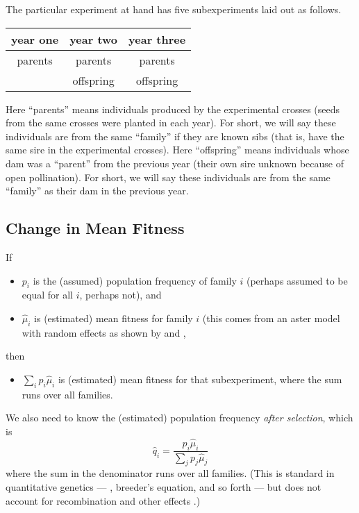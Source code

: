 \documentclass[11pt]{article}
\begin{document}
The particular experiment at hand has five subexperiments laid out as follows.
\begin{center}
\begin{tabular}{ccc}
\toprule
year one & year two & year three \\
\midrule
parents & parents & parents \\
        & offspring & offspring \\
\bottomrule
\end{tabular}
\end{center}
Here ``parents'' means individuals produced by the experimental crosses
(seeds from
the same crosses were planted in each year).  For short, we will say these
individuals are from the same ``family'' if they are known sibs
(that is, have the same sire in the experimental crosses).
Here ``offspring'' means individuals whose dam was a ``parent'' from the
previous year (their own sire unknown because of open pollination).
For short, we will say these
individuals are from the same ``family'' as their dam in the previous year.

\subsection{Change in Mean Fitness} \label{sec:change}

If
\begin{itemize}
\item $p_i$ is the (assumed) population frequency of family $i$
    (perhaps assumed to be equal for all $i$, perhaps not), and
\item $\hat{\mu}_i$ is (estimated) mean fitness for family $i$
    (this comes from an aster model with random effects as shown by
    \citet{kulbaba} and \citet{zenodo},
\end{itemize}
then
\begin{itemize}
\item $\sum_i p_i \hat{\mu}_i$ is (estimated) mean fitness for
that subexperiment, where the sum runs over all families.
\end{itemize}

We also need to know the (estimated) population frequency
\emph{after selection}, which is
\begin{equation*}
   \hat{q}_i = \frac{p_i \hat{\mu}_i}{\sum_j p_j \hat{\mu}_j}
\end{equation*}
where the sum in the denominator runs over all families.
(This is standard in quantitative genetics --- \citet{lande-arnold},
breeder's equation,
and so forth --- but does not account for recombination and other effects
\citep{pr70,pr72}.)
\end{document}
